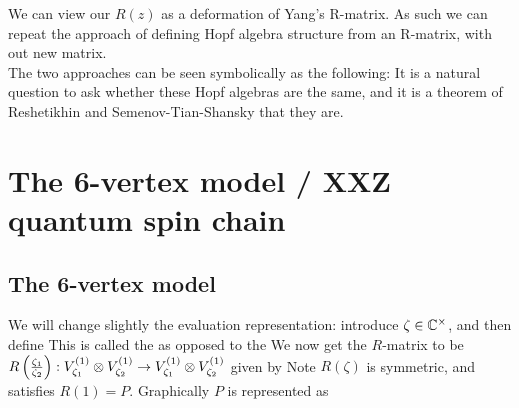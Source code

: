 \documentclass{article}
\begin{document}
\begin{remark}
We can view our $R(z)$ as a deformation of Yang's R-matrix. As such we can repeat the approach of defining Hopf algebra structure from an R-matrix, with out new matrix. \\
The two approaches can be seen symbolically as the following: 
It is a natural question to ask whether these Hopf algebras are the same, and it is a theorem of Reshetikhin and Semenov-Tian-Shansky that they are. 
\end{remark}

\section{The 6-vertex model / XXZ quantum spin chain}

\subsection{The 6-vertex model}

\begin{remark}
We will change slightly the evaluation representation: introduce $\zeta \in \mathbb{C}^\times$, and then define 
This is called the  as opposed to the 
We now get the $R$-matrix to be $R\left( \frac{\zeta_1}{\zeta_2} \right) : V_{\zeta_1}^{(1)} \otimes V_{\zeta_2}^{(1)} \to V_{\zeta_1}^{(1)} \otimes V_{\zeta_2}^{(1)}$ given by 
Note $R(\zeta)$ is symmetric, and satisfies $R(1) = P$. Graphically $P$ is represented as 
\begin{center}
\end{center}
\end{remark}
\end{document}
